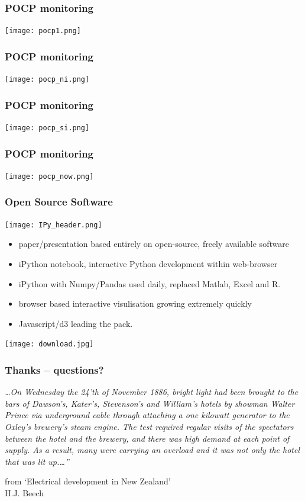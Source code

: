 \documentclass[aspectratio=169]{beamer}
\begin{document}
\frame
{\frametitle{POCP monitoring}
\begin{center}
\texttt{[image: pocp1.png]} 
\end{center}
}

\frame
{\frametitle{POCP monitoring}
\begin{center}
\texttt{[image: pocp\_ni.png]} 
\end{center}
}

\frame
{\frametitle{POCP monitoring}
\begin{center}
\texttt{[image: pocp\_si.png]} 
\end{center}
}

\frame
{\frametitle{POCP monitoring}
\begin{center}
\texttt{[image: pocp\_now.png]} 
\end{center}
}

\frame
{\frametitle{Open Source Software}

\begin{flushright}
\texttt{[image: IPy\_header.png]} 
\end{flushright}
\vspace{-5mm}
\begin{itemize}
   \item paper/presentation based entirely on open-source, freely available software
   \item iPython notebook, interactive Python development within web-browser
   \item iPython with Numpy/Pandas used daily, replaced Matlab, Excel and R.
   \item browser based interactive visulisation growing extremely quickly
   \item Javascript/d3 leading the pack.
\end{itemize}
\texttt{[image: download.jpg]} 

}

\frame
{\frametitle{Thanks -- questions?}

\vspace{20mm}
\emph{\ldots On Wednesday the 24'th of November 1886, bright light had been brought to the bars of Dawson's, Kater's, Stevenson's and William's hotels by showman Walter Prince via underground cable through attaching a one kilowatt generator to the Oxley's brewery's steam engine. The test required regular visits of the spectators between the hotel and the brewery, and there was high demand at each point of supply. As a result, many were carrying an overload and it was not only the hotel that was lit up.\ldots''}
\begin{flushright}
\scriptsize from `Electrical development in New Zealand' \\
H.J. Beech
\end{flushright}
}
\end{document}
